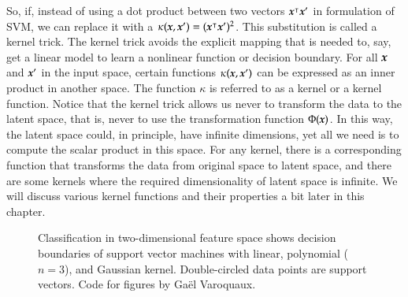 \begin{refsection}
So, if, instead of using a dot product between two vectors $\boldsymbol{x}^\intercal\boldsymbol{x}'$ in formulation of SVM, we can replace it with a $\kappa(\boldsymbol{x},\boldsymbol{x}')=(\boldsymbol{x}^\intercal \boldsymbol{x}')^2$. This substitution is called a kernel trick. The kernel trick avoids the explicit mapping that is needed to, say, get a linear model to learn a nonlinear function or decision boundary. For all $\boldsymbol{x}$ and $\boldsymbol{x}'$ in the input space, certain functions $\kappa(\boldsymbol{x}, \boldsymbol{x}')$ can be expressed as an inner product in another space. The function $\kappa$ is referred to as a kernel or a kernel function. Notice that the kernel trick allows us never to transform the data to the latent space, that is, never to use the transformation function $\Phi(\boldsymbol{x})$. In this way, the latent space could, in principle, have infinite dimensions, yet all we need is to compute the scalar product in this space. For any kernel, there is a corresponding function that transforms the data from original space to latent space, and there are some kernels where the required dimensionality of latent space is infinite. We will discuss various kernel functions and their properties a bit later in this chapter.

\begin{figure}
\caption{Classification in two-dimensional feature space shows decision boundaries of support vector machines with linear, polynomial ($n=3$), and Gaussian kernel. Double-circled data points are support vectors. Code for figures by Gaël Varoquaux.}
\label{fig:kernels-poly}
\end{figure}


\end{refsection}
